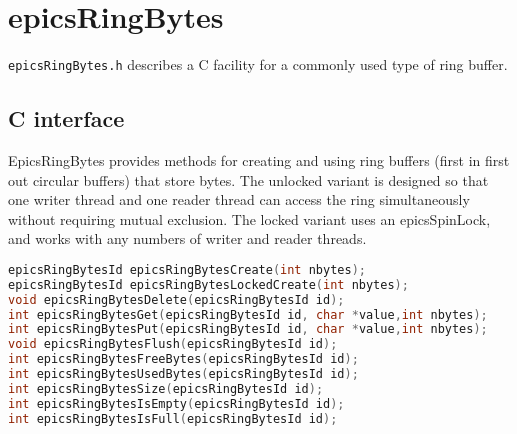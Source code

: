 

\section{epicsRingBytes}

\verb|epicsRingBytes.h| describes a C facility for a commonly used type of ring buffer.

\subsection{C interface}

EpicsRingBytes provides methods for creating and using ring buffers (first in first out circular buffers) that store bytes.
The unlocked variant is designed so that one writer thread and one reader thread can access the ring simultaneously without requiring mutual exclusion.
The locked variant uses an epicsSpinLock, and works with any numbers of writer and reader threads.

\begin{lstlisting}[language=C]
epicsRingBytesId epicsRingBytesCreate(int nbytes);
epicsRingBytesId epicsRingBytesLockedCreate(int nbytes);
void epicsRingBytesDelete(epicsRingBytesId id);
int epicsRingBytesGet(epicsRingBytesId id, char *value,int nbytes);
int epicsRingBytesPut(epicsRingBytesId id, char *value,int nbytes);
void epicsRingBytesFlush(epicsRingBytesId id);
int epicsRingBytesFreeBytes(epicsRingBytesId id);
int epicsRingBytesUsedBytes(epicsRingBytesId id);
int epicsRingBytesSize(epicsRingBytesId id);
int epicsRingBytesIsEmpty(epicsRingBytesId id);
int epicsRingBytesIsFull(epicsRingBytesId id);
\end{lstlisting}

